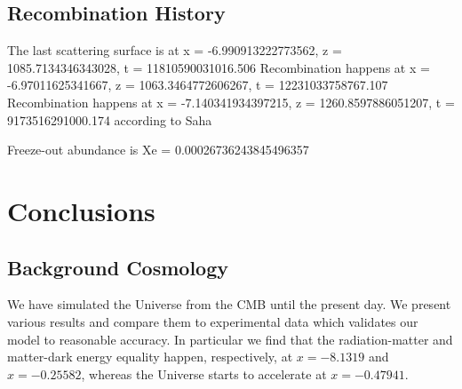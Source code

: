 \documentclass{aa}
\begin{document}
\subsection{Recombination History}

The last scattering surface is at x = -6.990913222773562, z = 1085.7134346343028, t = 11810590031016.506
Recombination happens at x = -6.97011625341667, z = 1063.3464772606267, t = 12231033758767.107
Recombination happens at x = -7.140341934397215, z = 1260.8597886051207, t = 9173516291000.174 according to Saha

Freeze-out abundance is Xe = 0.00026736243845496357

\section{Conclusions}

\subsection{Background Cosmology}
We have simulated the Universe from the CMB until the present day. We present various results and compare them to experimental data which validates our model to reasonable accuracy. In particular we find that the radiation-matter and matter-dark energy equality happen, respectively, at $x = -8.1319$ and $x = -0.25582$, whereas the Universe starts to accelerate at $x=-0.47941$.

\begin{acknowledgements}

\end{acknowledgements}

%
%



\end{document}
